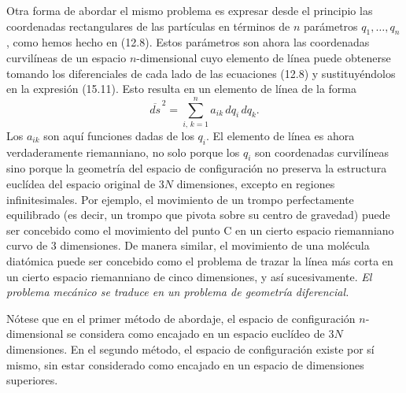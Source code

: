 \documentclass[12pt,a4paper]{book}
\begin{document}
\begin{center}
Otra forma de abordar el mismo problema es expresar desde el principio las coordenadas rectangulares de las part\'iculas en t\'erminos de $n$ par\'ametros $q_1, \ldots, q_n$, como hemos hecho en (12.8). Estos par\'ametros son ahora las coordenadas curvil\'ineas de un espacio $n$-dimensional cuyo elemento de l\'inea puede obtenerse tomando los diferenciales de cada lado de las ecuaciones (12.8) y sustituy\'endolos en la expresi\'on (15.11). Esto resulta en un elemento de l\'inea de la forma
\begin{equation}
\overline{ds}^{\,2} = \sum_{i,\,k=1}^{n} a_{ik}\,dq_i\,dq_k.
\tag{15.16}
\end{equation}
Los $a_{ik}$ son aqu\'i funciones dadas de los $q_i$. El elemento de l\'inea es ahora verdaderamente riemanniano, no solo porque los $q_i$ son coordenadas curvil\'ineas sino porque la geometr\'ia del espacio de configuraci\'on no preserva la estructura eucl\'idea del espacio original de $3N$ dimensiones, excepto en regiones infinitesimales. Por ejemplo, el movimiento de un trompo perfectamente equilibrado (es decir, un trompo que pivota sobre su centro de gravedad) puede ser concebido como el movimiento del punto C en un cierto espacio riemanniano curvo de 3 dimensiones. De manera similar, el movimiento de una mol\'ecula diat\'omica puede ser concebido como el problema de trazar la l\'inea m\'as corta en un cierto espacio riemanniano de cinco dimensiones, y as\'i sucesivamente. \textit{El problema mec\'anico se traduce en un problema de geometr\'ia diferencial.}

N\'otese que en el primer m\'etodo de abordaje, el espacio de configuraci\'on $n$-dimensional se considera como encajado en un espacio eucl\'ideo de $3N$ dimensiones. En el segundo m\'etodo, el espacio de configuraci\'on existe por s\'i mismo, sin estar considerado como encajado en un espacio de dimensiones superiores.

\begin{center}
\end{center}



\end{center}
\end{document}
